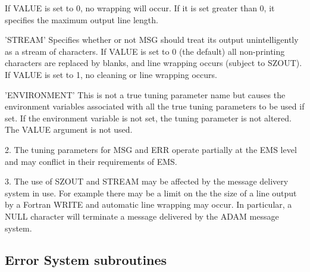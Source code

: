 \documentclass[twoside,11pt]{article}
\newcommand{\xlabel}[1]{}
\renewcommand{\_}{\texttt{\symbol{95}}}
\newcommand{\sstitem}{\item}
\newcommand{\sstitem}{\item}
\begin{document}
\begin {small}
{{{{         If VALUE is set to 0, no wrapping will occur. If it is set greater
         than 0, it specifies the maximum output line length.
      }
      \sstitem{'STREAM' Specifies whether or not MSG should treat its output
         unintelligently as a stream of characters.
         If VALUE is set to 0 (the default) all non-printing characters are
         replaced by blanks, and line wrapping occurs (subject to SZOUT).
         If VALUE is set to 1, no cleaning or line wrapping occurs.
      }
      \sstitem{'ENVIRONMENT' This is not a true tuning parameter name but causes
         the environment variables associated with all the true tuning
         parameters to be used if set. If the environment variable is
         not set, the tuning parameter is not altered. The VALUE argument
         is not used.
      }
      }

      2. The tuning parameters for MSG and ERR operate partially at the EMS
         level and may conflict in their requirements of EMS.

      3. The use of SZOUT and STREAM may be affected by the message delivery
        system in use. For example there may be a limit on the the size of a
        line output by a Fortran WRITE and automatic line wrapping may occur.
        In particular, a NULL character will terminate a message delivered by
        the ADAM message system.
   }
}
\end {small}

\newpage
\subsection{\xlabel{error_system_subroutines}Error System subroutines}
\end{document}
